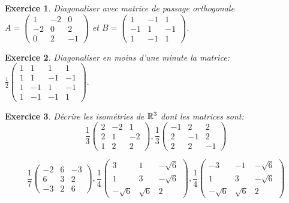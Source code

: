 \documentclass[12pt,a4paper]{article}
\theoremstyle{break}
\newtheorem{Exo}{Exercice}
\begin{document}
\begin{Exo}
	Diagonaliser avec matrice de passage orthogonale $A=\begin{pmatrix}
		1 & -2 & 0 \\
		-2 & 0 & 2 \\
		0 & 2 & -1
	\end{pmatrix}$ et $B=\begin{pmatrix}
	1 & -1 & 1 \\
	-1 & 1 & -1 \\
	1 & -1 & 1
\end{pmatrix}$.

	
\end{Exo}
	
	  \begin{Exo}
	  	Diagonaliser en moins d'une minute la matrice: $\frac{1}{2}\left( 
	\begin{array}{cccc}
		1 & 1 & 1 & 1 \\ 
		1 & 1 & -1 & -1 \\ 
		1 & -1 & 1 & -1 \\ 
		1 & -1 & -1 & 1
	\end{array}
	\right) .$
	  \end{Exo}
	
	 \begin{Exo}
	 	 D\'{e}crire les isom\'{e}tries de $\Bbb{R}^{3}$ dont les matrices
	sont: $$\frac{1}{3}\left( 
	\begin{array}{ccc}
		2 & -2 & 1 \\ 
		2 & 1 & -2 \\ 
		1 & 2 & 2
	\end{array}
	\right) ,\frac{1}{3}\left( 
	\begin{array}{ccc}
		-1 & 2 & 2 \\ 
		2 & -1 & 2 \\ 
		2 & 2 & -1
	\end{array}
	\right) $$
	
	$$\frac{1}{7}\left( 
	\begin{array}{ccc}
		-2 & 6 & -3 \\ 
		6 & 3 & 2 \\ 
		-3 & 2 & 6
	\end{array}
	\right) ,\frac{1}{4}\left( 
	\begin{array}{ccc}
		3 & 1 & -\sqrt{6} \\ 
		1 & 3 & -\sqrt{6} \\ 
		-\sqrt{6} & \sqrt{6} & 2
	\end{array}
	\right) ,\frac{1}{4}\left( 
	\begin{array}{ccc}
		-3 & -1 & -\sqrt{6} \\ 
		1 & 3 & -\sqrt{6} \\ 
		-\sqrt{6} & \sqrt{6} & 2
	\end{array}
	\right) $$
	 \end{Exo}
	
\end{document}
